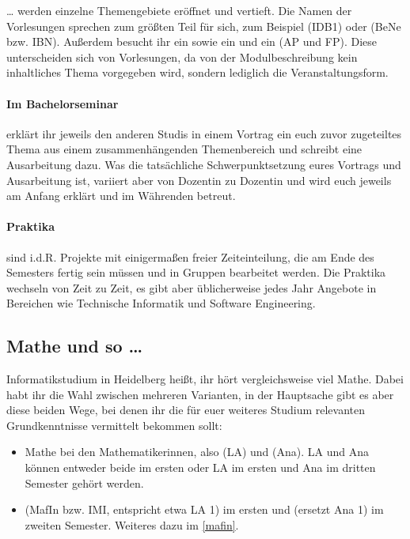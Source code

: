 \dots{} werden einzelne Themengebiete eröffnet und vertieft. Die Namen der Vorlesungen sprechen zum größten Teil für sich, zum Beispiel  (\gls{IDB1}) oder  (\gls{BeNe} bzw. IBN). Außerdem besucht ihr ein  sowie ein  und ein  (\gls{AP} und \gls{FP}). Diese unterscheiden sich von Vorlesungen, da von der Modulbeschreibung kein inhaltliches Thema vorgegeben wird, sondern lediglich die Veranstaltungsform.

\paragraph*{Im Bachelorseminar} erklärt ihr jeweils den anderen Studis in einem Vortrag ein euch zuvor zugeteiltes Thema aus einem zusammenhängenden Themenbereich und schreibt eine Ausarbeitung dazu. Was die tatsächliche Schwerpunktsetzung eures Vortrags und Ausarbeitung ist, variiert aber von Dozentin zu Dozentin und wird euch jeweils am Anfang erklärt und im Währenden betreut.

\paragraph*{Praktika} sind i.d.R. Projekte mit einigermaßen freier Zeiteinteilung, die am Ende des Semesters fertig sein müssen und in Gruppen bearbeitet werden. Die Praktika wechseln von Zeit zu Zeit, es gibt aber üblicherweise jedes Jahr Angebote in Bereichen wie Technische Informatik und Software Engineering.

\subsection{Mathe und so \dots}

Informatikstudium in Heidelberg heißt, ihr hört vergleichsweise viel Mathe. Dabei habt ihr die Wahl zwischen mehreren Varianten, in der Hauptsache gibt es aber diese beiden Wege, bei denen ihr die für euer weiteres Studium relevanten Grundkenntnisse vermittelt bekommen sollt:

\begin{itemize}
    \item Mathe bei den Mathematikerinnen, also  (\gls{LA}) und  (\gls{Ana}). \gls{LA} und \gls{Ana} können entweder beide im ersten oder \gls{LA} im ersten und \gls{Ana} im dritten Semester gehört werden.
    \item {} (\gls{MafIn} bzw. IMI, entspricht etwa \gls{LA} 1) im ersten und  (ersetzt \gls{Ana} 1) im zweiten Semester. Weiteres dazu im \autoref{mafin}.
\end{itemize}

